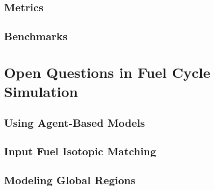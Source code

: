 \subsection{Metrics}


\subsection{Benchmarks}


\section{Open Questions in Fuel Cycle Simulation}

\subsection{Using Agent-Based Models}

\subsection{Input Fuel Isotopic Matching}

\subsection{Modeling Global Regions}
